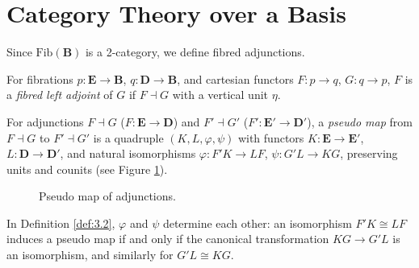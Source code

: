 \documentclass{article}
\begin{document}
\newpage
\section{Category Theory over a Basis}
\label{sec:category-theory-basis}

Since $\text{Fib}(\mathbf{B})$ is a 2-category, we define fibred adjunctions.

\begin{definition}
\label{def:3.1}
For fibrations $p : \mathbf{E} \to \mathbf{B}$, $q : \mathbf{D} \to \mathbf{B}$, and cartesian functors $F : p \to q$, $G : q \to p$, $F$ is a \emph{fibred left adjoint} of $G$ if $F \dashv G$ with a vertical unit $\eta$.
\end{definition}

\begin{definition}
\label{def:3.2}
For adjunctions $F \dashv G$ ($F : \mathbf{E} \to \mathbf{D}$) and $F' \dashv G'$ ($F' : \mathbf{E}' \to \mathbf{D}'$), a \emph{pseudo map} from $F \dashv G$ to $F' \dashv G'$ is a quadruple $(K, L, \varphi, \psi)$ with functors $K : \mathbf{E} \to \mathbf{E}'$, $L : \mathbf{D} \to \mathbf{D}'$, and natural isomorphisms $\varphi : F' K \to L F$, $\psi : G' L \to K G$, preserving units and counits (see Figure \ref{fig:pseudo-map}).
\begin{figure}[h]
    \centering
    \caption{Pseudo map of adjunctions.}
    \label{fig:pseudo-map}
\end{figure}
\end{definition}

\begin{lemma}
\label{lem:3.3}
In Definition \ref{def:3.2}, $\varphi$ and $\psi$ determine each other: an isomorphism $F' K \cong L F$ induces a pseudo map if and only if the canonical transformation $K G \to G' L$ is an isomorphism, and similarly for $G' L \cong K G$.
\end{lemma}
\end{document}
